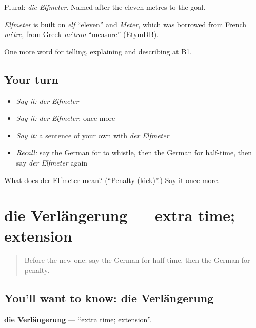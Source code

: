 Plural: \emph{die Elfmeter}. Named after the eleven metres to the goal.

\begin{cousinweb}
\emph{Elfmeter} is built on \emph{elf} \textquotedblleft{}eleven\textquotedblright{} and \emph{Meter}, which was borrowed from French \emph{mètre}, from Greek \emph{métron} \textquotedblleft{}measure\textquotedblright{} (EtymDB).
\end{cousinweb}

\begin{grammarlens}[title={What you've built}]
One more word for telling, explaining and describing at B1.
\end{grammarlens}

\subsection*{Your turn}
\begin{itemize}
\raggedright
  \item \emph{Say it:} \emph{der Elfmeter}
  \item \emph{Say it:} \emph{der Elfmeter}, once more
  \item \emph{Say it:} a sentence of your own with \emph{der Elfmeter}
  \item \emph{Recall:} say the German for to whistle, then the German for half-time, then say \emph{der Elfmeter} again
\end{itemize}

\begin{tcolorbox}[breakable,colback=teal!4,colframe=teal!35!black,title={Before you move on}]
What does der Elfmeter mean? (\textquotedblleft{}Penalty (kick)\textquotedblright{}.) Say it once more.
\end{tcolorbox}
\section[die Verlängerung]{die Verlängerung — extra time; extension}

\label{lesson:GE-C507-verlaengerung}



\begin{quote}
Before the new one: say the German for half-time, then the German for penalty.
\end{quote}

\subsection*{You'll want to know: die Verlängerung}
\textbf{die Verlängerung} — \textquotedblleft{}extra time; extension\textquotedblright{}.

